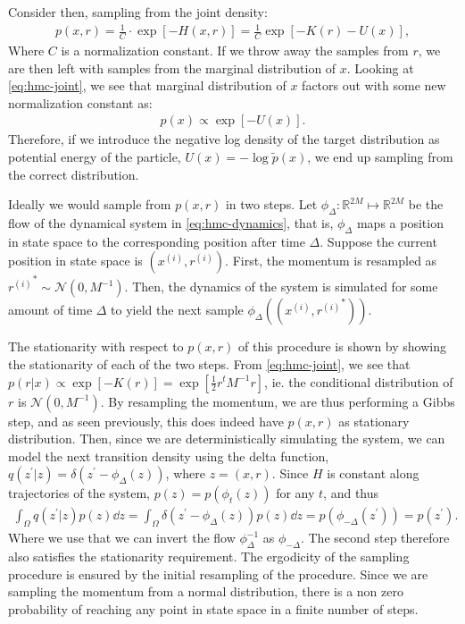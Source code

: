 Consider then, sampling from the joint density:
\begin{align} \label{eq:hmc-joint}
    p(x, r) =\frac{1}{C}\cdot  \exp\left[ -H(x, r)\right] = \frac{1}{C}\exp\left[-K(r) - U(x)  \right],
\end{align}
Where $C$ is a normalization constant.
If we throw away the samples from $r$, we are then left with samples from the marginal distribution of $x$.
Looking at \cref{eq:hmc-joint}, we see that marginal distribution of $x$ factors out with some new normalization constant as:
\begin{align}
    p(x) \propto \exp[-U(x)].
\end{align}
Therefore, if we introduce the negative log density of the target distribution as potential energy of the particle, $U(x) = -\log{\tilde{p}(x)}$, we end up sampling from the correct distribution.

\newcommand{\newx}{x^{\prime}}
\newcommand{\newr}{{r^{\prime}}}
\newcommand{\oldx}{{x^{(i)}}}
\newcommand{\oldr}{{r^{(i)}}}
\newcommand{\nextx}{x^{(i+1)}}
\newcommand{\nextr}{{r^{(i+1)}}}

Ideally we would sample from $p(x, r)$ in two steps.
Let $\phi_\Delta: \mathbb{R}^{2M} \mapsto \mathbb{R}^{2M}$ be the flow of the dynamical system in \cref{eq:hmc-dynamics}, that is, $\phi_\Delta$ maps a position in state space to the corresponding position after time $\Delta$.
Suppose the current position in state space is $(\oldx, \oldr)$. 
First, the momentum is resampled as $\oldr^\ast\sim \mathcal{N}(0, M^{-1})$.
Then, the dynamics of the system is simulated for some amount of time $\Delta$ to yield the next sample $\phi_\Delta((\oldx, \oldr^\ast))$.

The stationarity with respect to $p(x, r)$ of this procedure is shown by showing the stationarity of each of the two steps.
From \cref{eq:hmc-joint}, we see that $p(r|x) \propto \exp[-K(r)] = \exp[\frac{1}{2}r^tM^{-1}r]$, ie. the conditional distribution of $r$ is $\mathcal{N}(0, M^{-1})$.
By resampling the momentum, we are thus performing a Gibbs step, and as seen previously, this does indeed have $p(x, r)$ as stationary distribution.
Then, since we are deterministically simulating the system, we can model the next transition density using the delta function, $q(z^\prime|z) = \delta(z^\prime - \phi_\Delta(z))$, where $z=(x, r)$. 
Since $H$ is constant along trajectories of the system, $p(z) =p(\phi_t(z))$ for any $t$, and thus
\begin{align} \label{eq:}
    \int_{\Omega} q(z^\prime| z ) p(z) \dd{z} = \int_{\Omega} \delta(z^\prime - \phi_\Delta(z))p(z) \dd{z} 
    = p(\phi_{-\Delta}(z^\prime)) = p(z^\prime).
\end{align}
Where we use that we can invert the flow $\phi^{-1}_\Delta$ as $\phi_{-\Delta}$. 
The second step therefore also satisfies the stationarity requirement.
The ergodicity of the sampling procedure is ensured by the initial resampling of the procedure.
Since we are sampling the momentum from a normal distribution, there is a non zero probability of reaching any point in state space in a finite number of steps.

